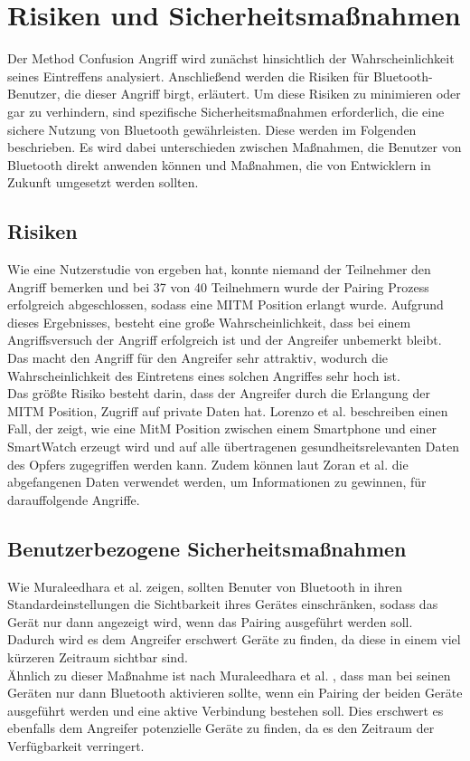 \documentclass[
    a4paper,
    pagesize,
    pdftex,
    12pt,
]{scrartcl}
\begin{document}
    \section{Risiken und Sicherheitsmaßnahmen}
    Der Method Confusion Angriff wird zunächst hinsichtlich der Wahrscheinlichkeit seines Eintreffens analysiert. Anschließend werden die Risiken für Bluetooth-Benutzer, die dieser Angriff birgt, erläutert.
    Um diese Risiken zu minimieren oder gar zu verhindern, sind spezifische Sicherheitsmaßnahmen erforderlich, die eine sichere Nutzung von Bluetooth gewährleisten. Diese werden im Folgenden beschrieben. Es wird dabei unterschieden zwischen Maßnahmen, die Benutzer von Bluetooth direkt anwenden können und Maßnahmen, die von Entwicklern in Zukunft umgesetzt werden sollten.

    \subsection{Risiken}
    Wie eine Nutzerstudie von \cite{method_confusion_attack} ergeben hat, konnte niemand der Teilnehmer den Angriff bemerken und bei 37 von 40 Teilnehmern wurde der Pairing Prozess erfolgreich abgeschlossen, sodass eine MITM Position erlangt wurde. Aufgrund dieses Ergebnisses, besteht eine große Wahrscheinlichkeit, dass bei einem Angriffsversuch der Angriff erfolgreich ist und der Angreifer unbemerkt bleibt. Das macht den Angriff für den Angreifer sehr attraktiv, wodurch die Wahrscheinlichkeit des Eintretens eines solchen Angriffes sehr hoch ist. \\
    Das größte Risiko besteht darin, dass der Angreifer durch die Erlangung der MITM Position, Zugriff auf private Daten hat. Lorenzo et al. \cite{technologies7010015} beschreiben einen Fall, der zeigt, wie eine MitM Position zwischen einem Smartphone und einer SmartWatch erzeugt wird und auf alle übertragenen gesundheitsrelevanten Daten des Opfers zugegriffen werden kann. Zudem können laut Zoran et al. \cite{weitere_risiken} die abgefangenen Daten verwendet werden, um Informationen zu gewinnen, für darauffolgende Angriffe.

    \subsection{Benutzerbezogene Sicherheitsmaßnahmen}
    Wie Muraleedhara et al. \cite{bluetooth_newest_security_risks} zeigen, sollten Benuter von Bluetooth in ihren Standardeinstellungen die Sichtbarkeit ihres Gerätes einschränken, sodass das Gerät nur dann angezeigt wird, wenn das Pairing ausgeführt werden soll. Dadurch wird es dem Angreifer erschwert Geräte zu finden, da diese in einem viel kürzeren Zeitraum sichtbar sind. \\
    Ähnlich zu dieser Maßnahme ist nach Muraleedhara et al. \cite{bluetooth_newest_security_risks}, dass man bei seinen Geräten nur dann Bluetooth aktivieren sollte, wenn ein Pairing der beiden Geräte ausgeführt werden und eine aktive Verbindung bestehen soll. Dies erschwert es ebenfalls dem Angreifer potenzielle Geräte zu finden, da es den Zeitraum der Verfügbarkeit verringert.
\end{document}
